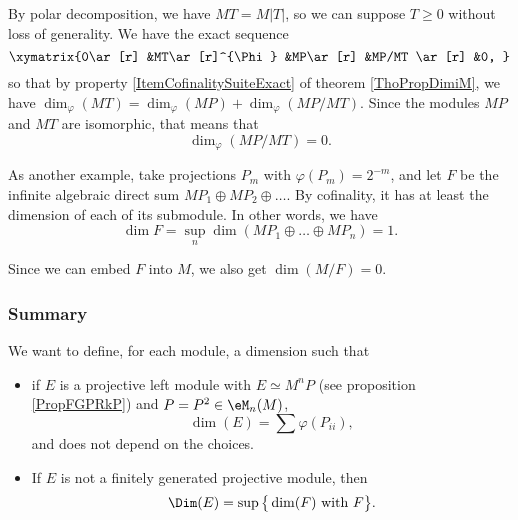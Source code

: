 By polar decomposition, we have $MT=M| T |$, so we can suppose $T\geq 0$ without loss of generality. We have the exact sequence
\[ 
	\xymatrix{%
   0\ar[r] 	&MT\ar[r]^{\Phi}	&MP\ar[r]	&MP/MT \ar[r]	&0,	
}
\]
so that by property \ref{ItemCofinalitySuiteExact} of theorem \ref{ThoPropDimiM}, we have $\dim_{\varphi}(MT)=\dim_{\varphi}(MP)+\dim_{\varphi}(MP/MT)$. Since the modules $MP$ and $MT$ are isomorphic, that means that 
\[ 
	\dim_{\varphi}(MP/MT)=0.
\]

As another example, take projections $P_m$ with $\varphi(P_m)=2^{-m}$, and let $F$ be the infinite algebraic direct sum $MP_1\oplus MP_2\oplus\ldots$. By cofinality, it has at least the dimension of each of its submodule. In other words, we have
\[ 
	\dim F=\sup_n\dim(MP_1\oplus\ldots\oplus MP_n)=1.
\]

Since we can embed $F$ into $M$, we also get $\dim(M/F)=0$.

					\subsubsection{Summary}

We want to define, for each module, a dimension such that
\begin{itemize}
\item if $E$ is a projective left module with $E\simeq M^nP$ (see proposition \ref{PropFGPRkP}) and $P=P^2\in\eM_n(M)$,
\[ 
	\dim(E)=\sum \varphi(P_{ii}),
\]
and does not depend on the choices.
\item If $E$ is not a finitely generated projective module, then
\begin{equation}		\label{DefDimAvecGrandD}
	\Dim(E)=\sup\big\{  \dim(F)\text{ with }F \big\}.
\end{equation}
\end{itemize}
